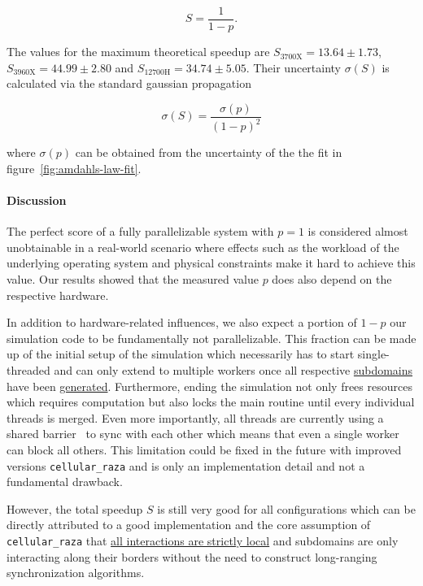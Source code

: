 \documentclass[fontsize=11pt,a4paper]{article}
\begin{document}
\begin{equation}
    S = \frac{1}{1-p}.
    \label{eq:amdahls-law-maximum-speedup}
\end{equation}

The values for the maximum theoretical speedup are $S_\text{3700X}=13.64\pm1.73$,
$S_\text{3960X}=44.99\pm2.80$ and $S_\text{12700H}=34.74\pm5.05$.
Their uncertainty $\sigma(S)$ is calculated via the standard gaussian propagation

\begin{equation}
    \sigma(S) = \frac{\sigma(p)}{(1-p)^2}
\end{equation}

where $\sigma(p)$ can be obtained from the uncertainty of the the fit in
figure~\ref{fig:amdahls-law-fit}.

\paragraph{Discussion}
The perfect score of a fully parallelizable system with $p=1$ is considered almost unobtainable
in a real-world scenario where effects such as the workload of the underlying operating system
and physical constraints make it hard to achieve this value.
Our results showed that the measured value $p$ does also depend on the respective hardware.

In addition to hardware-related influences, we also expect a portion of $1-p$ our simulation code
to be fundamentally not parallelizable.
This fraction can be made up of the initial setup of the simulation which necessarily has to start
single-threaded and can only extend to multiple workers once all respective
\href{https://cellular-raza.com/docs/cellular_raza_core/backend/chili/struct.SubDomainBox.html}
{subdomains} have been
\href{https://cellular-raza.com/docs/cellular_raza_concepts/trait.Domain.html}{generated}.
Furthermore, ending the simulation not only frees resources which requires computation but also
locks the main routine until every individual threads is merged.
Even more importantly, all threads are currently using a shared barrier~\cite{GjengsetHurdles2018}
to sync with each other which means that even a single worker can block all others.
This limitation could be fixed in the future with improved versions \lstinline{cellular_raza} and is
only an implementation detail and not a fundamental drawback.

However, the total speedup $S$ is still very good for all configurations which can be directly
attributed to a good implementation and the core assumption of \lstinline{cellular_raza} that
\href{https://cellular-raza.com/guides/introduction/#local-rules}
{all interactions are strictly local} and subdomains are only interacting along their borders
without the need to construct long-ranging synchronization algorithms.
\end{document}
